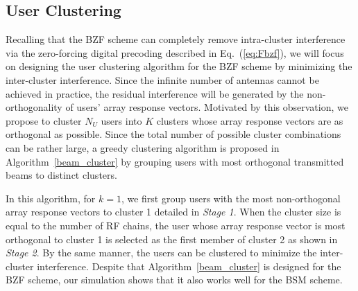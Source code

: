 \documentclass[conference]{IEEEtran}
\begin{document}
{\subsection{User Clustering}
Recalling that the BZF scheme can completely remove intra-cluster interference via the zero-forcing digital precoding described in Eq.~(\ref{eq:Fbzf}), we will focus on designing the user clustering algorithm for the BZF scheme by minimizing the inter-cluster interference. Since the infinite number of antennas cannot be achieved in practice, the residual interference will be generated by the non-orthogonality of users' array response vectors. Motivated by this observation, we propose to cluster $N_U$ users into $K$ clusters whose array response vectors are as orthogonal as possible. Since the total number of possible cluster combinations can be rather large, a greedy clustering algorithm is proposed in Algorithm~\ref{beam_cluster} by grouping users with most orthogonal transmitted beams to distinct clusters.


In this algorithm, for $k=1$, we first group users with the most non-orthogonal array response vectors to cluster 1 detailed in \textit{Stage 1}. When the cluster size is equal to the number of RF chains, the user whose array response vector is most orthogonal to cluster 1 is selected as the first member of cluster 2 as shown in \textit{Stage 2}. By the same manner, the users can be clustered to minimize the inter-cluster interference. Despite that Algorithm~\ref{beam_cluster} is designed for the BZF scheme, our simulation shows that it also works well for the BSM scheme.


}
\end{document}
